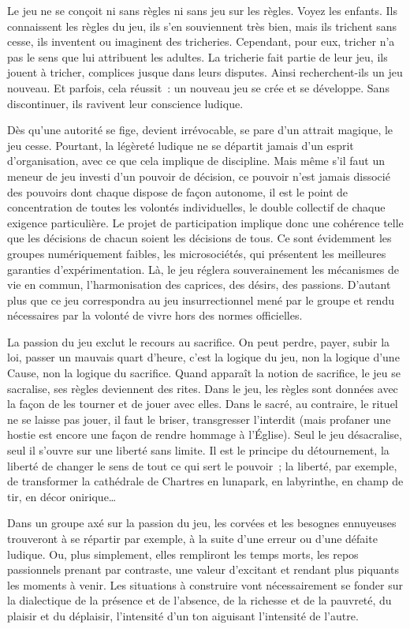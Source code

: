 \documentclass[french,twoside]{book} %
\begin{document}
\noindent Le jeu ne se conçoit ni sans règles ni sans jeu sur les règles. Voyez les enfants. Ils connaissent les règles du jeu, ils s’en souviennent très bien, mais ils trichent sans cesse, ils inventent ou imaginent des tricheries. Cependant, pour eux, tricher n’a pas le sens que lui attribuent les adultes. La tricherie fait partie de leur jeu, ils jouent à tricher, complices jusque dans leurs disputes. Ainsi recherchent-ils un jeu nouveau. Et parfois, cela réussit : un nouveau jeu se crée et se développe. Sans discontinuer, ils ravivent leur conscience ludique.\par
Dès qu’une autorité se fige, devient irrévocable, se pare d’un attrait magique, le jeu cesse. Pourtant, la légèreté ludique ne se départit jamais d’un esprit d’organisation, avec ce que cela implique de discipline. Mais même s’il faut un meneur de jeu investi d’un pouvoir de décision, ce pouvoir n’est jamais dissocié des pouvoirs dont chaque dispose de façon autonome, il est le point de concentration de toutes les volontés individuelles, le double collectif de chaque exigence particulière. Le projet de participation implique donc une cohérence telle que les décisions de chacun soient les décisions de tous. Ce sont évidemment les groupes numériquement faibles, les microsociétés, qui présentent les meilleures garanties d’expérimentation. Là, le jeu réglera souverainement les mécanismes de vie en commun, l’harmonisation des caprices, des désirs, des passions. D’autant plus que ce jeu correspondra au jeu insurrectionnel mené par le groupe et rendu nécessaires par la volonté de vivre hors des normes officielles.\par
La passion du jeu exclut le recours au sacrifice. On peut perdre, payer, subir la loi, passer un mauvais quart d’heure, c’est la logique du jeu, non la logique d’une Cause, non la logique du sacrifice. Quand apparaît la notion de sacrifice, le jeu se sacralise, ses règles deviennent des rites. Dans le jeu, les règles sont données avec la façon de les tourner et de jouer avec elles. Dans le sacré, au contraire, le rituel ne se laisse pas jouer, il faut le briser, transgresser l’interdit (mais profaner une hostie est encore une façon de rendre hommage à l’Église). Seul le jeu désacralise, seul il s’ouvre sur une liberté sans limite. Il est le principe du détournement, la liberté de changer le sens de tout ce qui sert le pouvoir ; la liberté, par exemple, de transformer la cathédrale de Chartres en lunapark, en labyrinthe, en champ de tir, en décor onirique…\par
Dans un groupe axé sur la passion du jeu, les corvées et les besognes ennuyeuses trouveront à se répartir par exemple, à la suite d’une erreur ou d’une défaite ludique. Ou, plus simplement, elles rempliront les temps morts, les repos passionnels prenant par contraste, une valeur d’excitant et rendant plus piquants les moments à venir. Les situations à construire vont nécessairement se fonder sur la dialectique de la présence et de l’absence, de la richesse et de la pauvreté, du plaisir et du déplaisir, l’intensité d’un ton aiguisant l’intensité de l’autre.\par
\end{document}
